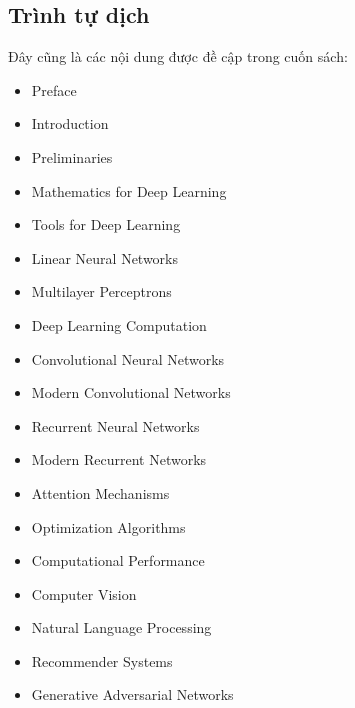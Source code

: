 \documentclass[letterpaper,11pt,english]{sphinxmanual}
\begin{document}
\subsection{Trình tự dịch}
\label{\detokenize{intro_vn:trinh-tu-dich}}
Đây cũng là các nội dung được đề cập trong cuốn sách:
\begin{itemize}
\item {} 
Preface

\item {} 
Introduction

\item {} 
Preliminaries

\item {} 
Mathematics for Deep Learning

\item {} 
Tools for Deep Learning

\item {} 
Linear Neural Networks

\item {} 
Multilayer Perceptrons

\item {} 
Deep Learning Computation

\item {} 
Convolutional Neural Networks

\item {} 
Modern Convolutional Networks

\item {} 
Recurrent Neural Networks

\item {} 
Modern Recurrent Networks

\item {} 
Attention Mechanisms

\item {} 
Optimization Algorithms

\item {} 
Computational Performance

\item {} 
Computer Vision

\item {} 
Natural Language Processing

\item {} 
Recommender Systems

\item {} 
Generative Adversarial Networks

\end{itemize}
\end{document}
